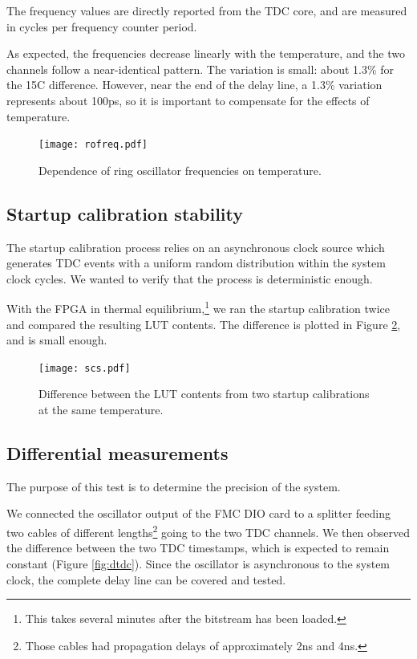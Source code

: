 \documentclass[a4paper,11pt]{article}
\begin{document}
The frequency values are directly reported from the TDC core, and are measured in cycles per frequency counter period.

As expected, the frequencies decrease linearly with the temperature, and the two channels follow a near-identical pattern. The variation is small: about 1.3\% for the 15\degree C difference. However, near the end of the delay line, a 1.3\% variation represents about 100ps, so it is important to compensate for the effects of temperature.

\begin{figure}[H]
\texttt{[image: rofreq.pdf]}
\caption{Dependence of ring oscillator frequencies on temperature.}
\label{fig:rofreq}
\end{figure}

\subsection{Startup calibration stability}
The startup calibration process relies on an asynchronous clock source which generates TDC events with a uniform random distribution within the system clock cycles. We wanted to verify that the process is deterministic enough.

With the FPGA in thermal equilibrium,\footnote{This takes several minutes after the bitstream has been loaded.} we ran the startup calibration twice and compared the resulting LUT contents. The difference is plotted in Figure \ref{fig:scs}, and is small enough.

\begin{figure}[H]
\texttt{[image: scs.pdf]}
\caption{Difference between the LUT contents from two startup calibrations at the same temperature.}
\label{fig:scs}
\end{figure}

\subsection{Differential measurements}
The purpose of this test is to determine the precision of the system.

We connected the oscillator output of the FMC DIO card to a splitter feeding two cables of different lengths\footnote{Those cables had propagation delays of approximately 2ns and 4ns.} going to the two TDC channels. We then observed the difference between the two TDC timestamps, which is expected to remain constant (Figure \ref{fig:dtdc}). Since the oscillator is asynchronous to the system clock, the complete delay line can be covered and tested.
\end{document}

